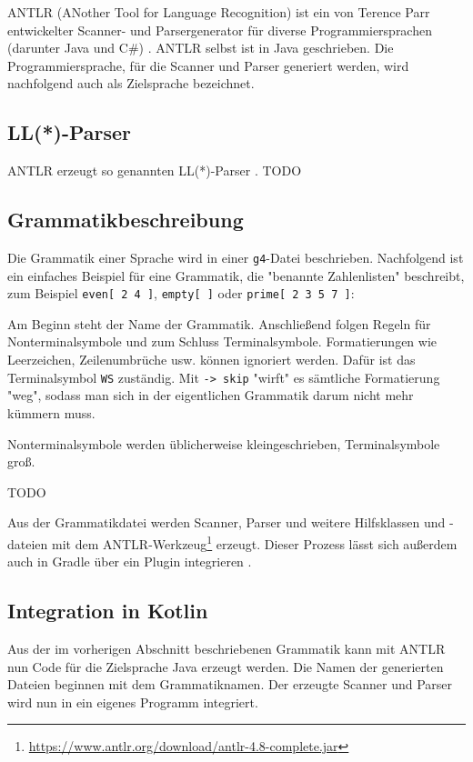 ANTLR (ANother Tool for Language Recognition) ist ein von Terence Parr entwickelter Scanner- und Parsergenerator für diverse Programmiersprachen (darunter Java und C\#{}) \cite{ANTLR4Reference} \cite{ANTLRWebsite}. ANTLR selbst ist in Java geschrieben. Die Programmiersprache, für die Scanner und Parser generiert werden, wird nachfolgend auch als Zielsprache bezeichnet.

\subsection{LL(*)-Parser}

ANTLR erzeugt so genannten LL(*)-Parser \cite{ANTLRLLStar}. TODO

\subsection{Grammatikbeschreibung}

Die Grammatik einer Sprache wird in einer \lstinline{g4}-Datei beschrieben. Nachfolgend ist ein einfaches Beispiel für eine Grammatik, die "benannte Zahlenlisten" beschreibt, zum Beispiel \lstinline{even[ 2 4 ]}, \lstinline{empty[ ]} oder \lstinline{prime[ 2 3 5 7 ]}:



Am Beginn steht der Name der Grammatik. Anschließend folgen Regeln für Nonterminalsymbole und zum Schluss Terminalsymbole. Formatierungen wie Leerzeichen, Zeilenumbrüche usw. können ignoriert werden. Dafür ist das Terminalsymbol \lstinline{WS} zuständig. Mit \lstinline{-> skip} "wirft" es sämtliche Formatierung "weg", sodass man sich in der eigentlichen Grammatik darum nicht mehr kümmern muss. 

Nonterminalsymbole werden üblicherweise kleingeschrieben, Terminalsymbole groß.

TODO

Aus der Grammatikdatei werden Scanner, Parser und weitere Hilfsklassen und -dateien mit dem ANTLR-Werkzeug\footnote{\url{https://www.antlr.org/download/antlr-4.8-complete.jar}} erzeugt. Dieser Prozess lässt sich außerdem auch in Gradle über ein Plugin integrieren \cite{GradleANTLRPlugin}.

\subsection{Integration in Kotlin}

Aus der im vorherigen Abschnitt beschriebenen Grammatik kann mit ANTLR nun Code für die Zielsprache Java erzeugt werden. Die Namen der generierten Dateien beginnen mit dem Grammatiknamen. Der erzeugte Scanner und Parser wird nun in ein eigenes Programm integriert.

